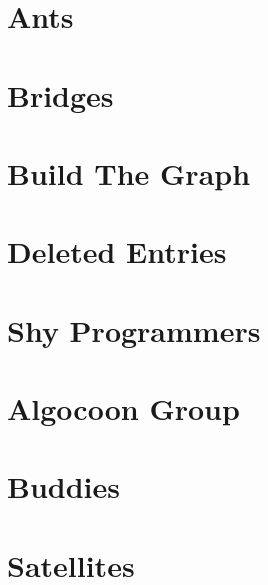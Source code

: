 \documentclass[a4paper, 10pt]{article}
\let\stdsection\section
\renewcommand\section{\newpage\stdsection}
\newcommand{\includecode}[1]{
    }
\begin{document}
    \section{Ants}
        \includecode{../problems/w04/Ants/Ants1.cpp}
        
    \section{Bridges}
        \includecode{../problems/w04/Bridges/Bridges1_BGL.cpp}
        \includecode{../problems/w04/Bridges/Bridges1_Handmade.cpp}
        
    \section{Build The Graph}
        \includecode{../problems/w04/Build_The_Graph/BuildTheGraph1.cpp}
        
    \section{Deleted Entries}
        \includecode{../problems/w04/Deleted_Entries/DeletedEntries1.cpp}
    
    \section{Shy Programmers}
        \includecode{../problems/w04/Shy_Programmers/ShyProgrammers1.cpp}

    
    \section{Algocoon Group}
        \includecode{../problems/w05/AlgocooenGroup/AlgoconGroup1.cpp}
        
    \section{Buddies}
        \includecode{../problems/w05/Buddies/Buddies1.cpp}
        
    \section{Satellites}
        \includecode{../problems/w05/Satellites/Satellites1.cpp}
        
\end{document}
